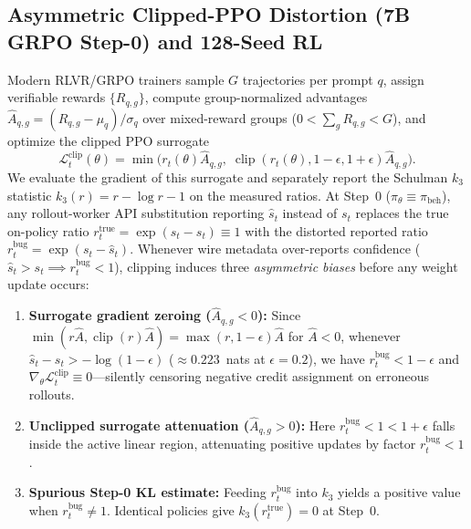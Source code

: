 \documentclass[11pt,letterpaper]{article}
\begin{document}
\subsection{Asymmetric Clipped-PPO Distortion (7B GRPO Step-0) and 128-Seed RL}
\label{sec:rq3-rl}
Modern RLVR/GRPO trainers sample $G$ trajectories per prompt $q$, assign verifiable rewards $\{R_{q,g}\}$, compute group-normalized advantages $\hat{A}_{q,g}=(R_{q,g}-\mu_q)/\sigma_q$ over mixed-reward groups ($0<\sum_g R_{q,g}<G$), and optimize the clipped PPO surrogate~\cite{ppo,grpo}
\begin{equation}
\mathcal{L}_t^{\text{clip}}(\theta) = \min\!\big(r_t(\theta)\hat{A}_{q,g},\; \operatorname{clip}(r_t(\theta), 1-\epsilon, 1+\epsilon)\hat{A}_{q,g}\big).
\end{equation}
We evaluate the gradient of this surrogate and separately report the Schulman $k_3$ statistic $k_3(r)=r-\log r-1$ on the measured ratios. At Step~0 ($\pi_\theta \equiv \pi_{\text{beh}}$), any rollout-worker API substitution reporting $\hat{s}_t$ instead of $s_t$ replaces the true on-policy ratio $r_t^{\text{true}} = \exp(s_t - s_t) \equiv 1$ with the distorted reported ratio $r_t^{\text{bug}} = \exp(s_t - \hat{s}_t)$. Whenever wire metadata over-reports confidence ($\hat{s}_t > s_t \implies r_t^{\text{bug}} < 1$), clipping induces three \emph{asymmetric biases} before any weight update occurs:
\begin{enumerate}
\item \textbf{Surrogate gradient zeroing ($\hat{A}_{q,g} < 0$):} Since $\min(r \hat{A}, \operatorname{clip}(r)\hat{A}) = \max(r, 1-\epsilon)\hat{A}$ for $\hat{A}<0$, whenever $\hat{s}_t - s_t > -\log(1-\epsilon)$ ($\approx 0.223$~nats at $\epsilon=0.2$), we have $r_t^{\text{bug}} < 1-\epsilon$ and \textbf{$\nabla_\theta \mathcal{L}_t^{\text{clip}} \equiv 0$}---silently censoring negative credit assignment on erroneous rollouts.
\item \textbf{Unclipped surrogate attenuation ($\hat{A}_{q,g} > 0$):} Here $r_t^{\text{bug}} < 1 < 1+\epsilon$ falls inside the active linear region, attenuating positive updates by factor $r_t^{\text{bug}} < 1$.
\item \textbf{Spurious Step-0 KL estimate:} Feeding $r_t^{\text{bug}}$ into $k_3$ yields a positive value when $r_t^{\text{bug}}\ne 1$. Identical policies give $k_3(r_t^{\text{true}})=0$ at Step~0.
\end{enumerate}
\end{document}
